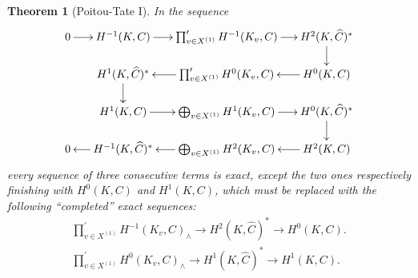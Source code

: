 \documentclass[11pt]{article}
\newcommand{\tprod}{{\textstyle\prod}}
\theoremstyle{plain}
\newtheorem{theo}{Theorem}[section]
\theoremstyle{definition}
\begin{document}
\begin{theo}[Poitou-Tate I] \label{spt1}
In the sequence
\begin{equation} \label{ptdiag1}
\begin{array}{c}
\xymatrix@=5mm{
0 \ar[r]& H^{-1}(K,C) \ar[r]& \prod^{\prime}_{v \in X^{(1)}} H^{-1}(K_v,C) \ar[r]&H^2(K,\widehat C)^*\ar[d]\\
& H^1(K,\widehat C)^* \ar[d]&\ar[l] \prod^{\prime}_{v \in X^{(1)}} H^{0}(K_v,C)&\ar[l] H^0(K,C)\\
& H^1(K,C) \ar[r]& \bigoplus_{v \in X^{(1)}} H^1(K_v,C) \ar[r]& H^0(K,\widehat C)^*\ar[d]\\
0 &\ar[l] H^{-1}(K,\widehat C)^* &\ar[l] \bigoplus_{v \in X^{(1)}}H^2(K_v,C)&\ar[l] H^2(K,C)
}
\end{array}
\end{equation}
every sequence of three consecutive terms is exact, except the two ones
respectively finishing with $H^0(K,C)$ and $H^1(K,C)$, which must be
replaced with the following ``completed'' exact sequences:\vspace*{-3pt}
\begin{gather*}
\tprod^{\prime}_{v \in X^{(1)}} H^{-1}(K_v,C)_{\wedge} \to H^2(K,\widehat C)^*
\to H^0(K,C).
\\
\tprod^{\prime}_{v \in X^{(1)}} H^{0}(K_v,C)_{\wedge} \to H^1(K,\widehat C)^*
\to H^1(K,C).
\end{gather*}
\end{theo}
\end{document}
